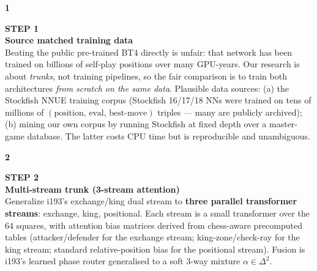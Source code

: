 \documentclass[10pt,a4paper]{article}
\begin{document}
\begin{minipage}{\linewidth}
\begin{minipage}[t]{0.06\linewidth}
\selectfont\LARGE\bfseries\color{forest}1
\end{minipage}\hfill
\begin{minipage}[t]{0.93\linewidth}
\textcolor{muted}{\scriptsize\sffamily\bfseries STEP 1}\\[0pt]
\textcolor{deepforest}{\sffamily\normalsize\bfseries Source matched training data}\\[2pt]
Beating the public pre-trained BT4 directly is unfair: that network has been trained on billions of self-play positions over many GPU-years. Our research is about \emph{trunks}, not training pipelines, so the fair comparison is to train both architectures \emph{from scratch on the same data}. Plausible data sources: (a) the Stockfish NNUE training corpus (Stockfish 16/17/18 NNs were trained on tens of millions of $(\text{position},\,\text{eval},\,\text{best-move})$ triples — many are publicly archived); (b) mining our own corpus by running Stockfish at fixed depth over a master-game database. The latter costs CPU time but is reproducible and unambiguous.
\end{minipage}
\end{minipage}\par
\vspace{2pt}{\color{linecolor}\rule{\linewidth}{0.3pt}}\vspace{2pt}\par
\begin{minipage}{\linewidth}
\begin{minipage}[t]{0.06\linewidth}
\selectfont\LARGE\bfseries\color{forest}2
\end{minipage}\hfill
\begin{minipage}[t]{0.93\linewidth}
\textcolor{muted}{\scriptsize\sffamily\bfseries STEP 2}\\[0pt]
\textcolor{deepforest}{\sffamily\normalsize\bfseries Multi-stream trunk (3-stream attention)}\\[2pt]
Generalize i193's exchange/king dual stream to \textbf{three parallel transformer streams}: exchange, king, positional. Each stream is a small transformer over the 64 squares, with attention bias matrices derived from chess-aware precomputed tables (attacker/defender for the exchange stream; king-zone/check-ray for the king stream; standard relative-position bias for the positional stream). Fusion is i193's learned phase router generalised to a soft 3-way mixture $\alpha \in \Delta^2$.
\end{minipage}
\end{minipage}\par
\end{document}
